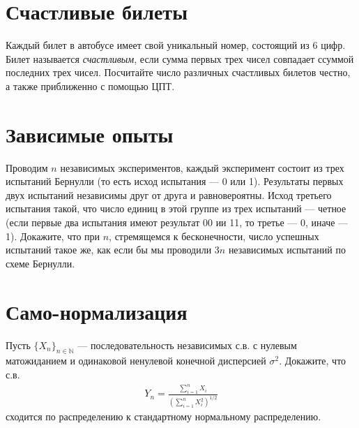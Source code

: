 \documentclass[12pt]{article}
\newcommand\N{\mathbb{N}}
\begin{document}
\section{Счастливые билеты}

Каждый билет в автобусе имеет свой уникальный номер, состоящий из 6 цифр. Билет называется \emph{счастливым}, если сумма первых трех чисел совпадает ссуммой последних трех чисел. Посчитайте число различных счастливых билетов честно, а также приближенно с помощью ЦПТ.

\section{Зависимые опыты}

Проводим $n$ независимых экспериментов, каждый эксперимент состоит из трех испытаний Бернулли (то есть исход испытания --- 0 или 1). Результаты первых двух испытаний независимы друг от друга и равновероятны. Исход третьего испытания такой, что число единиц в этой группе из трех испытаний --- четное (если первые два испытания имеют результат 00 ии 11, то третье --- 0, иначе --- 1). Докажите, что при $n$, стремящемся к бесконечности, число успешных испытаний такое же, как если бы мы проводили $3n$ независимых испытаний по схеме Бернулли. 

\section{Само-нормализация}

Пусть $\{X_n\}_{n \in \N}$ --- последовательность независимых с.в. с нулевым матожиданием и одинаковой ненулевой конечной дисперсией $\sigma^2$. Докажите, что с.в.
\begin{align*}
    Y_n = \frac{\sum_{i = 1}^n X_i}{\left(\sum_{i = 1}^n X_i^2\right)^{1/2}}
\end{align*}
сходится по распределению к стандартному нормальному распределению.
\end{document}
